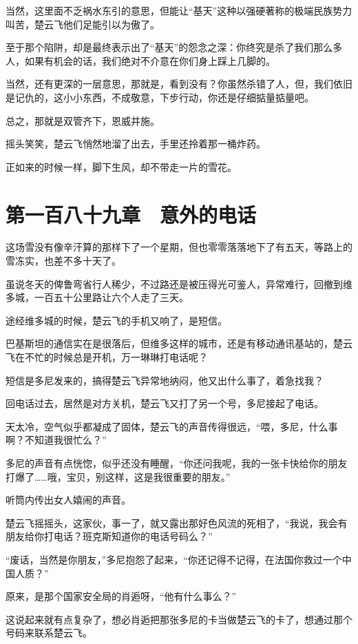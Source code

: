 当然，这里面不乏祸水东引的意思，但能让“基天”这种以强硬著称的极端民族势力叫苦，楚云飞他们足能引以为傲了。

至于那个陷阱，却是最终表示出了“基天”的怨念之深：你终究是杀了我们那么多人，如果有机会的话，我们绝对不介意在你们身上踩上几脚的。

当然，还有更深的一层意思，那就是，看到没有？你虽然杀错了人，但，我们依旧是记仇的，这小小东西，不成敬意，下步行动，你还是仔细掂量掂量吧。

总之，那就是双管齐下，恩威并施。

摇头笑笑，楚云飞悄然地溜了出去，手里还拎着那一桶炸药。

正如来的时候一样，脚下生风，却不带走一片的雪花。

\section{第一百八十九章　意外的电话}

这场雪没有像辛汗算的那样下了一个星期，但也零零落落地下了有五天，等路上的雪冻实，也差不多十天了。

虽说冬天的俾鲁弯省行人稀少，不过路还是被压得光可鉴人，异常难行，回撤到维多城，一百五十公里路让六个人走了三天。

途经维多城的时候，楚云飞的手机又响了，是短信。

巴基斯坦的通信实在是很落后，但维多这样的城市，还是有移动通讯基站的，楚云飞在不忙的时候总是开机，万一琳琳打电话呢？

短信是多尼发来的，搞得楚云飞异常地纳闷，他又出什么事了，着急找我？

回电话过去，居然是对方关机，楚云飞又打了另一个号，多尼接起了电话。

天太冷，空气似乎都凝成了固体，楚云飞的声音传得很远，“喂，多尼，什么事啊？不知道我很忙么？”

多尼的声音有点恍惚，似乎还没有睡醒，“你还问我呢，我的一张卡快给你的朋友打爆了……哦，宝贝，别这样，这是我很重要的朋友。”

听筒内传出女人嬉闹的声音。

楚云飞摇摇头，这家伙，事一了，就又露出那好色风流的死相了，“我说，我会有朋友给你打电话？班克斯知道你的电话号码么？”

“废话，当然是你朋友，”多尼抱怨了起来，“你还记得不记得，在法国你救过一个中国人质？”

原来，是那个国家安全局的肖逅呀，“他有什么事么？”

这说起来就有点复杂了，想必肖逅把那张多尼的卡当做楚云飞的卡了，想通过那个号码来联系楚云飞。

